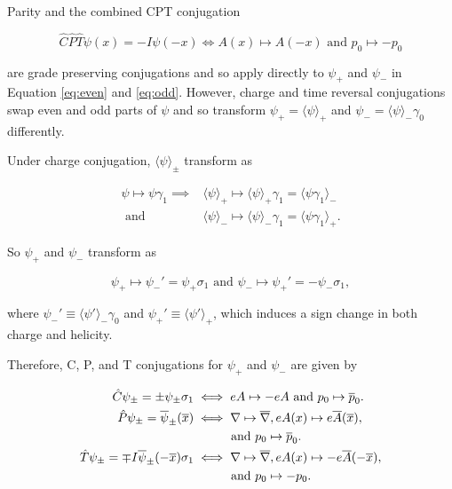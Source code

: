 \documentclass[twocolumn]{article}
\begin{document}
  Parity and the combined CPT conjugation

  \begin{equation}
    \hat C \hat P \hat T \psi(x) = -I \psi(-x) \iff A(x) \mapsto A(-x) \text{ and } p_0 \mapsto -p_0 \label{eq:cpt}
  \end{equation}

  are grade preserving conjugations and so apply directly to $\psi_+$ and $\psi_-$ in Equation \ref{eq:even} and \ref{eq:odd}. However, charge and time reversal conjugations swap even and odd parts of $\psi$ and so transform $\psi_+ = \langle \psi \rangle_+$ and $\psi_- = \langle \psi \rangle_- \gamma_0$ differently.

  Under charge conjugation, $\langle \psi \rangle_\pm$ transform as

  \begin{align}
    \psi \mapsto \psi \gamma_1 \implies 
    &\langle \psi \rangle_+ \mapsto \langle \psi \rangle_+ \gamma_1 = \langle \psi \gamma_1 \rangle_- \\
    \text{ and } 
    &\langle \psi \rangle_- \mapsto \langle \psi \rangle_- \gamma_1 = \langle \psi \gamma_1 \rangle_+.
  \end{align}

  So $\psi_+$ and $\psi_-$ transform as

  \begin{equation}
    \psi_+ \mapsto \psi_-' = \psi_+ \sigma_1
    \text{ and } 
    \psi_- \mapsto \psi_+' = - \psi_- \sigma_1,
  \end{equation}

  where $\psi_-' \equiv \langle \psi' \rangle_- \gamma_0$ and $\psi_+' \equiv \langle \psi' \rangle_+$, which induces a sign change in both charge and helicity.

  Therefore, C, P, and T conjugations for $\psi_+$ and $\psi_-$ are given by

  \begin{align}
    \hat C \psi_\pm = \pm \psi_\pm \sigma_1 &\iff eA \mapsto - eA \text{ and } p_0 \mapsto \overline p_0. \label{eq:pmcharge}\\
    \hat P \psi_\pm = \overline \psi_\pm(\overline x) &\iff \nabla \mapsto \overline \nabla, eA(x) \mapsto e\overline A(\overline x), \notag \\ & \hspace{3em} \text{and } p_0 \mapsto \overline p_0. \label{eq:pmparity} \\
    \hat T \psi_\pm = \mp I \overline \psi_\pm(-\overline x) \sigma_1 &\iff \nabla \mapsto \overline\nabla, eA(x) \mapsto -e\overline A(-\overline x), \notag \\ & \hspace{3em} \text{and } p_0 \mapsto - p_0.\label{eq:pmtime}
  \end{align}
\end{document}
